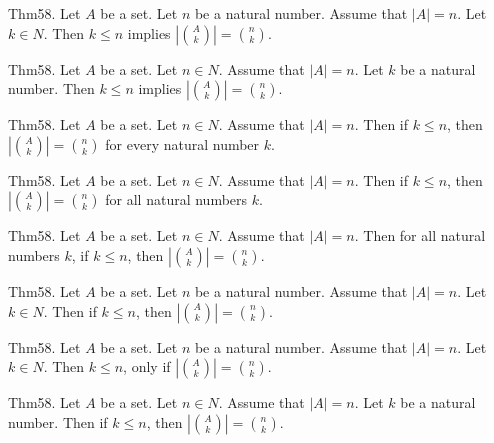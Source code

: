 \documentclass{article}
\begin{document}
Thm58. Let $A$ be a set. Let $n$ be a natural number. Assume that $| A | = n$. Let $k \in N$. Then $k \leq n$ implies $| \binom{ A }{ k}| = \binom{ n }{ k}$.

Thm58. Let $A$ be a set. Let $n \in N$. Assume that $| A | = n$. Let $k$ be a natural number. Then $k \leq n$ implies $| \binom{ A }{ k}| = \binom{ n }{ k}$.

Thm58. Let $A$ be a set. Let $n \in N$. Assume that $| A | = n$. Then if $k \leq n$, then $| \binom{ A }{ k}| = \binom{ n }{ k}$ for every natural number $k$.

Thm58. Let $A$ be a set. Let $n \in N$. Assume that $| A | = n$. Then if $k \leq n$, then $| \binom{ A }{ k}| = \binom{ n }{ k}$ for all natural numbers $k$.

Thm58. Let $A$ be a set. Let $n \in N$. Assume that $| A | = n$. Then for all natural numbers $k$, if $k \leq n$, then $| \binom{ A }{ k}| = \binom{ n }{ k}$.

Thm58. Let $A$ be a set. Let $n$ be a natural number. Assume that $| A | = n$. Let $k \in N$. Then if $k \leq n$, then $| \binom{ A }{ k}| = \binom{ n }{ k}$.

Thm58. Let $A$ be a set. Let $n$ be a natural number. Assume that $| A | = n$. Let $k \in N$. Then $k \leq n$, only if $| \binom{ A }{ k}| = \binom{ n }{ k}$.

Thm58. Let $A$ be a set. Let $n \in N$. Assume that $| A | = n$. Let $k$ be a natural number. Then if $k \leq n$, then $| \binom{ A }{ k}| = \binom{ n }{ k}$.
\end{document}
